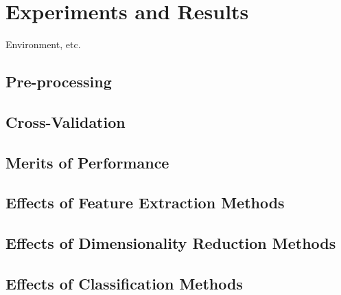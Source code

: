 \chapter{Experiments and Results}
\label{chap:experiments}

Environment, etc.

\section{Pre-processing}

\section{Cross-Validation}

\section{Merits of Performance}

\section{Effects of Feature Extraction Methods}

\section{Effects of Dimensionality Reduction Methods}

\section{Effects of Classification Methods}

